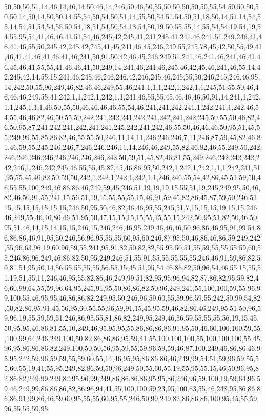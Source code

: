 50,50,50,51,14,46,14,46,14,50,46,14,246,50,46,50,55,50,50,50,50,50,55,54,50,50,50,50,50,14,50,14,50,50,14,55,54,50,54,50,51,14,55,50,54,51,54,50,51,18,50,14,51,14,54,55,14,54,51,54,54,55,50,54,18,51,54,50,54,18,54,50,19,50,55,55,14,55,54,54,19,54,19,54,55,95,54,41,46,46,41,51,54,46,245,42,245,41,241,245,41,241,46,241,51,249,246,41,46,41,46,55,50,245,42,245,42,245,41,45,241,46,45,246,249,55,245,78,45,42,50,55,49,41,46,41,41,46,41,46,41,46,241,50,91,50,42,46,45,246,249,51,241,46,241,46,241,46,41,46,45,46,41,55,55,41,46,46,41,50,249,14,241,46,241,46,245,46,42,45,46,241,46,55,14,42,245,42,14,55,15,241,46,245,46,246,246,42,246,245,46,245,55,50,246,245,246,46,95,14,242,50,55,96,249,46,82,46,46,249,55,46,241,1,1,1,242,1,242,1,1,245,51,55,50,46,46,46,46,249,55,41,242,1,1,242,1,242,1,1,241,46,55,55,45,46,46,46,50,91,14,241,1,242,1,1,245,1,1,1,46,50,55,50,46,46,46,46,55,54,46,241,241,242,241,1,242,241,1,242,46,54,55,46,46,82,46,50,55,50,242,241,242,241,242,241,242,241,242,245,50,55,50,46,82,46,50,95,87,241,242,241,242,241,241,245,242,241,242,46,55,50,46,46,46,50,95,51,45,55,249,99,55,85,86,82,46,55,55,50,246,11,14,11,246,246,246,7,11,246,87,59,45,82,46,81,46,59,55,245,246,246,7,246,246,246,11,14,246,46,249,55,82,46,82,46,55,249,50,242,246,246,246,246,246,246,246,246,242,50,59,51,45,82,46,81,55,249,246,242,242,242,242,246,1,246,242,245,46,55,55,45,82,45,46,86,95,50,242,1,242,1,242,1,1,1,242,241,51,95,55,45,46,82,50,59,50,242,1,242,1,242,1,242,1,1,246,246,55,54,42,86,45,51,59,50,46,55,55,100,249,46,86,86,46,249,59,45,246,51,19,19,19,15,55,51,19,245,249,95,50,46,82,46,50,91,55,241,15,56,51,19,15,55,55,55,15,46,91,59,45,82,86,45,87,59,50,246,51,15,15,15,15,15,15,15,246,50,95,50,46,82,46,46,95,55,245,51,7,15,15,15,19,15,15,246,46,249,55,46,46,86,46,51,95,50,47,15,15,15,15,55,15,55,15,242,50,95,51,82,50,46,50,95,51,46,14,15,14,15,15,246,15,246,246,46,95,249,46,46,46,50,96,86,46,95,91,99,54,86,86,86,46,91,95,50,246,56,96,95,55,55,60,95,60,246,87,95,50,46,86,46,86,59,249,242,55,96,63,96,19,60,96,59,55,241,95,91,82,50,82,82,55,95,50,51,55,59,55,55,55,59,60,55,246,86,96,249,46,86,82,50,95,249,246,51,55,91,55,55,55,55,55,246,46,91,59,86,82,50,81,51,95,50,14,56,55,55,55,55,56,55,15,45,51,95,54,46,86,82,50,96,54,46,55,15,55,51,19,51,55,11,246,46,95,55,82,86,46,249,99,51,82,95,95,96,94,82,87,86,82,95,59,82,46,60,99,64,55,59,96,64,95,245,91,95,50,86,86,82,50,96,249,241,55,100,100,59,55,96,99,100,55,46,95,95,46,86,86,82,249,95,50,246,96,59,60,55,59,96,59,55,242,50,99,54,82,50,82,86,95,91,45,56,95,60,55,55,96,59,91,15,45,95,59,46,82,86,46,249,95,51,50,96,59,96,19,55,59,59,51,246,86,95,55,81,86,82,249,95,249,46,56,59,55,55,55,56,19,15,45,50,95,95,46,86,81,55,10,249,46,95,95,95,55,86,86,86,86,91,95,50,46,60,100,100,59,55,100,99,64,246,249,100,50,82,86,86,86,95,59,41,55,100,100,100,55,100,100,100,55,45,96,95,86,86,86,82,249,100,50,50,56,95,59,55,59,96,59,59,46,87,100,249,46,86,86,46,95,95,242,59,96,59,59,55,59,60,55,14,46,95,95,86,86,86,46,249,99,54,51,59,96,59,55,55,60,55,19,41,55,95,249,82,86,50,50,96,249,50,55,60,55,19,55,95,55,15,46,50,96,95,82,86,82,249,99,249,82,95,96,99,249,86,86,86,86,95,95,86,246,96,59,100,19,59,64,96,59,46,249,99,86,86,86,82,86,96,94,41,55,100,100,59,23,95,100,63,55,46,248,95,86,86,86,86,91,99,86,46,59,60,95,55,55,60,95,55,246,50,99,249,82,86,86,86,100,95,45,55,59,96,55,55,59,95
